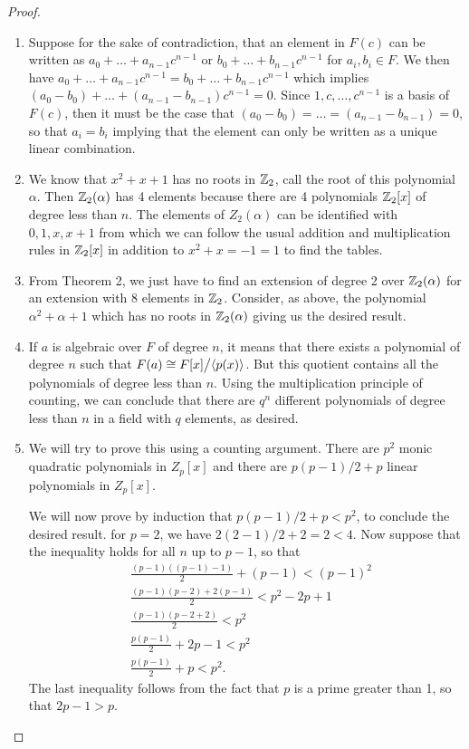 \begin{proof}
 \begin{enumerate}
     \item Suppose for the sake of contradiction, that an element in $F(c)$ can be written as $a_0+\dots+a_{n-1}c^{n-1}$ or $b_0+\dots+b_{n-1}c^{n-1}$ for $a_i,b_i\in F$. We then have $a_0+\dots+a_{n-1}c^{n-1}=b_0+\dots+b_{n-1}c^{n-1}$ which implies $(a_0-b_0)+\dots+(a_{n-1}-b_{n-1})c^{n-1}=0$. Since $1,c,\dots,c^{n-1}$ is a basis of $F(c)$, then it must be the case that $(a_0-b_0)=\dots=(a_{n-1}-b_{n-1})=0$, so that $a_i=b_i$ implying that the element can only be written as a unique linear combination.
    \item We know that $x^2+x+1$ has no roots in $\mathbb{Z}_2$, call the root of this polynomial $\alpha$. Then $\mathbb{Z}_2(\alpha)$ has 4 elements because there are 4 polynomials $\mathbb{Z}_2[x]$ of degree less than $n$. The elements of $Z_2(\alpha)$ can be identified with $0,1,x,x+1$ from which we can follow the usual addition and multiplication rules in $\mathbb{Z}_2[x]$ in addition to $x^2+x=-1=1$ to find the tables.
    \item From Theorem 2, we just have to find an extension of degree 2 over $\mathbb{Z}_2(\alpha)$ for an extension with 8 elements in $\mathbb{Z}_2$. Consider, as above, the polynomial $\alpha^2+\alpha+1$ which has no roots in $\mathbb{Z}_2(\alpha)$ giving us the desired result. 
    \item If $a$ is algebraic over $F$ of degree $n$, it means that there exists a polynomial of degree $n$ such that $F(a)\cong{\textstyle F[x]}\big/{\textstyle \langle p(x)\rangle}$. But this quotient contains all the polynomials of degree less than $n$. Using the multiplication principle of counting, we can conclude that there are $q^n$ different polynomials of degree less than $n$ in a field with $q$ elements, as desired.
    \item We will try to prove this using a counting argument. There are $p^2$ monic quadratic polynomials in $Z_p[x]$ and there are $p(p-1)/2+p$ linear polynomials in $Z_p[x]$. 
    
    We will now prove by induction that $p(p-1)/2+p<p^2$, to conclude the desired result. for $p=2$, we have $2(2-1)/2+2=2<4$. Now suppose that the inequality holds for all $n$ up to $p-1$, so that
    \begin{align}
        &\frac{(p-1)((p-1)-1)}{2}+(p-1) < (p-1)^2\\
        &\frac{(p-1)(p-2)+2(p-1)}{2} < p^2-2p+1\\
        &\frac{(p-1)(p-2+2)}{2} < p^2\\
        &\frac{p(p-1)}{2}+2p-1 < p^2\\
        &\frac{p(p-1)}{2}+p < p^2.
    \end{align}
    The last inequality follows from the fact that $p$ is a prime greater than 1, so that $2p-1>p$. 
    

\end{enumerate}
\end{proof}
